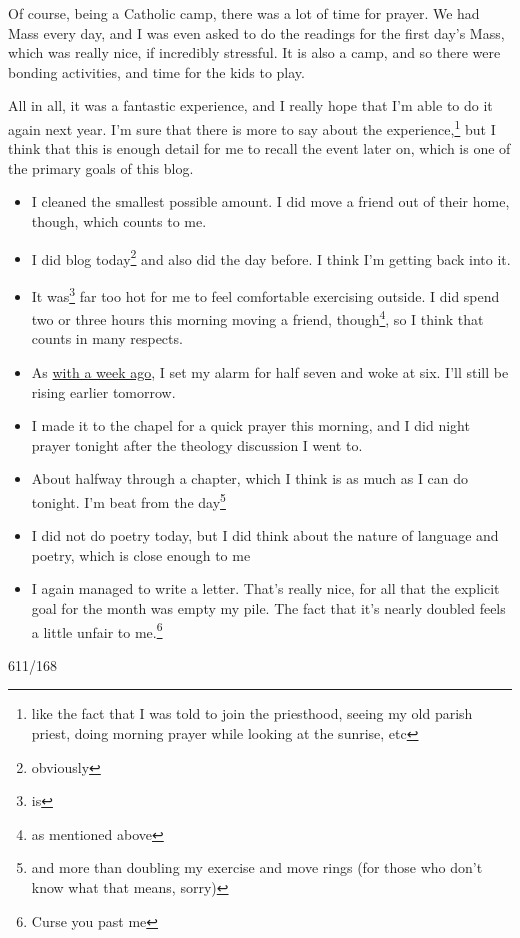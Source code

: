 \documentclass[12pt]{article}[titlepage]
\newcommand{\1}{\={a}}
\newcommand{\2}{\={e}}
\newcommand{\3}{\={\i}}
\newcommand{\4}{\=o}
\newcommand{\5}{\=u}
\newcommand{\6}{\={A}}
\renewcommand{\,}{\textsuperscript{,}}
\begin{document}
Of course, being a Catholic camp, there was a lot of time for prayer.
We had Mass every day, and I was even asked to do the readings for the first day's Mass, which was really nice, if incredibly stressful.
It is also a camp, and so there were bonding activities, and time for the kids to play.

All in all, it was a fantastic experience, and I really hope that I'm able to do it again next year.
I'm sure that there is more to say about the experience,\footnote{like the fact that I was told to join the priesthood, seeing my old parish priest, doing morning prayer while looking at the sunrise, etc} but I think that this is enough detail for me to recall the event later on, which is one of the primary goals of this blog.

\begin{itemize}
\item I cleaned the smallest possible amount. I did move a friend out of their home, though, which counts to me.
\item I did blog today\footnote{obviously} and also did the day before. I think I'm getting back into it.
\item It was\footnote{is} far too hot for me to feel comfortable exercising outside. I did spend two or three hours this morning moving a friend, though\footnote{as mentioned above}, so I think that counts in many respects.
\item As \href{conference-2.html}{with a week ago}, I set my alarm for half seven and woke at six. I'll still be rising earlier tomorrow.
\item I made it to the chapel for a quick prayer this morning, and I did night prayer tonight after the theology discussion I went to.
\item About halfway through a chapter, which I think is as much as I can do tonight. I'm beat from the day\footnote{and more than doubling my exercise and move rings (for those who don't know what that means, sorry)}
\item I did not do poetry today, but I did think about the nature of language and poetry, which is close enough to me
\item I again managed to write a letter. That's really nice, for all that the explicit goal for the month was empty my pile. The fact that it's nearly doubled feels a little unfair to me.\footnote{Curse you past me}
\end{itemize}

611/168
\end{document}
